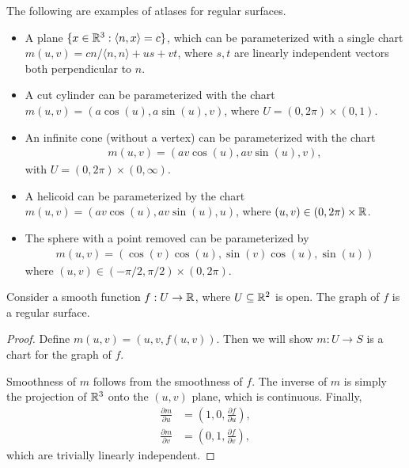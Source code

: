 \begin{exmp}
    The following are examples of atlases for regular surfaces.
    \begin{itemize}
        \item A plane $\{x \in \mathbb{R}^3 : \langle n, x\rangle = c\}$, which can be parameterized with a single chart $m(u, v) = cn/\langle n, n \rangle + us + vt$, where $s, t$ are linearly independent vectors both perpendicular to $n$.
        \item A cut cylinder can be parameterized with the chart $m(u, v) = (a\cos(u), a\sin(u), v)$, where $U = (0, 2\pi) \times (0, 1)$.
        \item An infinite cone (without a vertex) can be parameterized with the chart
        \begin{align*}
            m(u, v) = (av\cos(u), av\sin(u), v),
        \end{align*}
        with $U = (0, 2\pi) \times (0, \infty)$.
        \item A helicoid can be parameterized by the chart $m(u, v) = (av\cos(u), av\sin(u), u)$, where $(u, v) \in (0, 2\pi) \times \mathbb{R}$.
        \item The sphere with a point removed can be parameterized by
        \begin{align*}
            m(u, v) = (\cos(v)\cos(u), \sin(v)\cos(u), \sin(u))
        \end{align*}
        where $(u, v) \in (-\pi/2, \pi/2) \times (0, 2\pi)$.
    \end{itemize}
\end{exmp}

\begin{prop}\label{prop:graph-is-regular-surface}
    Consider a smooth function $f: U \to \mathbb{R}$, where $U \subseteq \mathbb{R}^2$ is open. The graph of $f$ is a regular surface.
\end{prop}

\begin{proof}
    Define $m(u, v) = (u, v, f(u, v))$. Then we will show $m: U \to S$ is a chart for the graph of $f$.

    Smoothness of $m$ follows from the smoothness of $f$. The inverse of $m$ is simply the projection of $\mathbb{R}^3$ onto the $(u, v)$ plane, which is continuous. Finally,
    \begin{align*}
        \frac{\partial m}{\partial u} &= (1, 0, \frac{\partial f}{\partial u}), \\
        \frac{\partial m}{\partial v} &= (0, 1, \frac{\partial f}{\partial v}),
    \end{align*}
    which are trivially linearly independent.
\end{proof}

